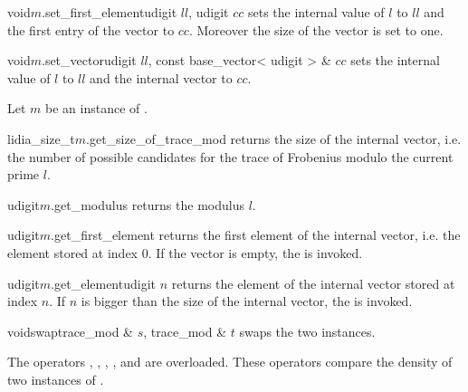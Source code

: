 \begin{fcode}{void}{$m$.set_first_element}{udigit $ll$, udigit $cc$}
  sets the internal value of $l$ to $ll$ and the first entry of the vector to $cc$.  Moreover
  the size of the vector is set to one.
\end{fcode}

\begin{fcode}{void}{$m$.set_vector}{udigit $ll$, const base_vector< udigit > & $cc$}
  sets the internal value of $l$ to $ll$ and the internal vector to $cc$.
\end{fcode}



\ACCS

Let $m$ be an instance of .

\begin{cfcode}{lidia_size_t}{$m$.get_size_of_trace_mod}{}
  returns the size of the internal vector, i.e.  the number of possible candidates for the trace
  of Frobenius modulo the current prime $l$.
\end{cfcode}

\begin{cfcode}{udigit}{$m$.get_modulus}{}
  returns the modulus $l$.
\end{cfcode}

\begin{cfcode}{udigit}{$m$.get_first_element}{}
  returns the first element of the internal vector, i.e.  the element stored at index 0.  If the
  vector is empty, the \LEH is invoked.
\end{cfcode}

\begin{cfcode}{udigit}{$m$.get_element}{udigit $n$}
  returns the element of the internal vector stored at index $n$.  If $n$ is bigger than the
  size of the internal vector, the \LEH is invoked.
\end{cfcode}

\begin{fcode}{void}{swap}{trace_mod & $s$, trace_mod & $t$}
  swaps the two instances.
\end{fcode}



\COMP

The operators \code{==}, \code{<}, \code{<=}, \code{>=}, and \code{>} are overloaded.  These
operators compare the density of two instances of .

